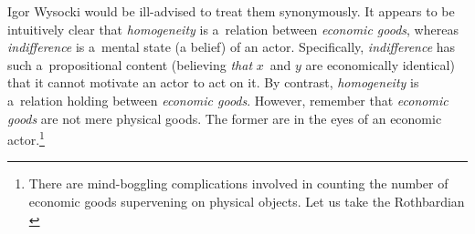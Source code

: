 \begin{artengenv}{Igor Wysocki}
would be ill-advised to treat them synonymously. It appears to be intuitively clear that \textit{homogeneity} is a~relation between \textit{economic goods}, whereas \textit{indifference} is a~mental state (a belief) of an actor. Specifically, \textit{indifference} has such a~propositional content (believing \textit{that} $x$~and $y$ are economically identical) that it cannot motivate an actor to act on it. By contrast, \textit{homogeneity} is a~relation holding between \textit{economic goods}. However, remember that \textit{economic goods} are not mere physical goods. The former are in the eyes of an economic actor.\footnote{There are mind-boggling complications involved in counting the number of economic goods supervening on physical objects. Let us take the Rothbardian 
\parencite*[][pp.73–74]{rothbard_man_2009} %
}
\end{artengenv}
